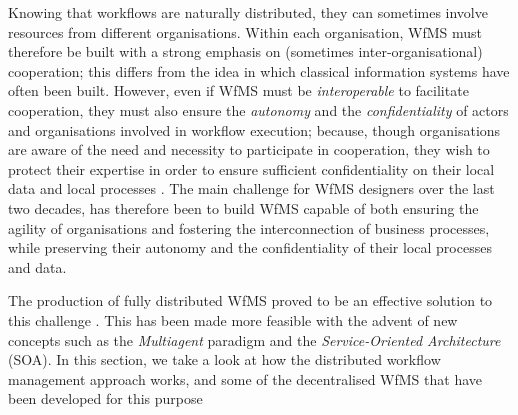 \label{chap1:sec:p2p-bpm}
Knowing that workflows are naturally distributed, they can sometimes involve resources from different organisations. Within each organisation, WfMS must therefore be built with a strong emphasis on (sometimes inter-organisational) cooperation; this differs from the idea in which classical information systems have often been built. However, even if WfMS must be \textit{interoperable} to facilitate cooperation, they must also ensure the \textit{autonomy} and the \textit{confidentiality} of actors and organisations involved in workflow execution; because, though organisations are aware of the need and necessity to participate in cooperation, they wish to protect their expertise in order to ensure sufficient confidentiality on their local data and local processes \cite{boukhedouma2015adaptation}. 
The main challenge for WfMS designers over the last two decades, has therefore been to build WfMS capable of both ensuring the agility of organisations and fostering the interconnection of business processes, while preserving their autonomy and the confidentiality of their local processes and data.

The production of fully distributed WfMS proved to be an effective solution to this challenge \cite{meilin1998workflow}. This has been made more feasible with the advent of new concepts such as the \textit{Multiagent} paradigm and the \textit{Service-Oriented Architecture} (SOA). In this section, we take a look at how the distributed workflow management approach works, and some of the decentralised WfMS that have been developed for this purpose


\label{chap1:sec:agent-soa-soc-concepts}

